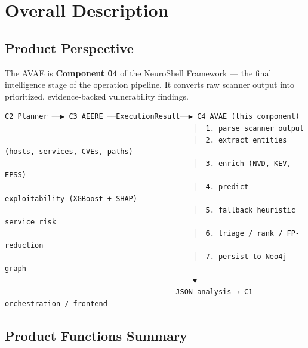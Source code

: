 \documentclass[10pt,journal,onecolumn]{IEEEtran}
\begin{document}
\section{Overall Description}

\subsection{Product Perspective}

The AVAE is \textbf{Component 04} of the NeuroShell Framework --- the final intelligence stage of the operation pipeline. It converts raw scanner output into prioritized, evidence-backed vulnerability findings.

\begin{lstlisting}
C2 Planner ──▶ C3 AEERE ──ExecutionResult──▶ C4 AVAE (this component)
                                            │  1. parse scanner output
                                            │  2. extract entities (hosts, services, CVEs, paths)
                                            │  3. enrich (NVD, KEV, EPSS)
                                            │  4. predict exploitability (XGBoost + SHAP)
                                            │  5. fallback heuristic service risk
                                            │  6. triage / rank / FP-reduction
                                            │  7. persist to Neo4j graph
                                            ▼
                                        JSON analysis → C1 orchestration / frontend
\end{lstlisting}

\subsection{Product Functions Summary}
\end{document}
